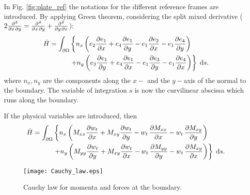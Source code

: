 \documentclass[preprint,12pt]{elsarticle}
\begin{document}
In Fig. \ref{fig:plate_ref} the notations for the different reference frames are introduced. By applying Green theorem, considering the split mixed derivative ($2 \diffp{}{x,y} = \diffp{}{x,y} +  \diffp{}{y,x}$):
\begin{align}
\dot{H} = \int_{\partial \Omega}  & \left\{  n_x \left(e_2 \diffp{e_1}{x}  + e_4 \diffp{e_1}{y}  - e_1 \diffp{e_2}{x} - e_1 \diffp{e_4}{y}\right)
\right. \nonumber \\
&   \left. +n_y \left(e_3 \diffp{e_1}{y} + e_4 \diffp{e_1}{x} - e_1 \diffp{e_3}{y} - e_1 \diffp{e_4}{x} \right) \right\} \d{s}.
\end{align}
where $n_x, n_y$ are the components along the $x-$ and the $y-$axis of the normal to the boundary. The variable of integration $s$ is now the curvilinear abscissa which runs along the boundary. 


If the physical variables are introduced, then  
\begin{align}
\dot{H} = \int_{\partial \Omega}  & \left\{  n_x \left(M_{xx} \diffp{w_t}{x} + M_{xy} \diffp{w_t}{y} - w_t \, \diffp{M_{xx} }{x}   - w_t \, \diffp{M_{xy}}{y}\right)
\right.  \nonumber\\
&  \left. +n_y \left(M_{yy} \diffp{w_t}{y} + M_{xy} \diffp{w_t}{x} - w_t \, \diffp{M_{yy}}{y} - w_t\, \diffp{M_{xy}}{x} \right) \right\} \d{s}.
\end{align}

\begin{figure}
	\centering
	\texttt{[image: Cauchy\_law.eps]}
	\caption{Cauchy law for momenta and forces at the boundary.}
	\label{fig:Cauchy_law}
\end{figure}
\end{document}
